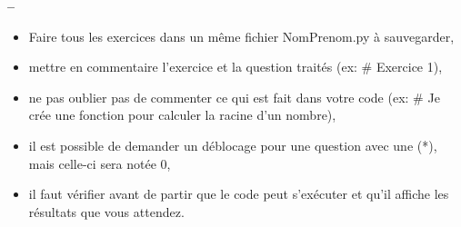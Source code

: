 


\usepackage{enumitem}







\begin{center}
{\Large\bf {\type} \no {\numero} -- \descrip}
\end{center}


\begin{boxedminipage}{.9\textwidth} 
\begin{itemize}
 \item Faire tous les exercices dans un même fichier {NomPrenom.py} à sauvegarder,
 \item mettre en commentaire l'exercice et la question traités (ex: \# Exercice 1),
 \item ne pas oublier pas de commenter ce qui est fait dans votre code (ex: \# Je crée une fonction pour calculer la racine d'un nombre),
\item il est possible de demander un déblocage pour une question avec une (*), mais celle-ci sera notée 0,
 \item il faut vérifier avant de partir que le code peut s'exécuter et qu'il affiche les résultats que vous attendez.
\end{itemize}
\end{boxedminipage}





